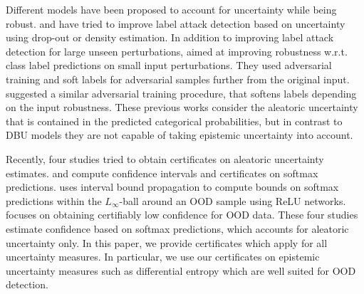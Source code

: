 Different models have been proposed to account for uncertainty while being robust.  \citep{smith2018} and \citep{simple_ood_adv_detection} have tried to improve label attack detection based on uncertainty using drop-out or density estimation. In addition to improving label attack detection for large unseen perturbations, \citep{stutz2020} aimed at improving robustness w.r.t. class label predictions on small input perturbations. They used adversarial training and soft labels for adversarial samples further from the original input. \citep{qin2020} suggested a similar adversarial training procedure, that softens labels depending on the input robustness. These previous works consider the aleatoric uncertainty that is contained in the predicted categorical probabilities, but in contrast to DBU models they are not capable of taking epistemic uncertainty into account. 



Recently, four studies tried to obtain certificates on aleatoric uncertainty estimates. \citep{single_model_quantile} and \citep{confidence_certificate_rs} compute confidence intervals and certificates on softmax predictions. \citep{bitterwolf2020} uses interval bound propagation to compute bounds on softmax predictions within the $L_{\infty}$-ball around an OOD sample using ReLU networks. \citep{meinke2020} focuses on obtaining certifiably low confidence for OOD data. These four studies estimate confidence based on softmax predictions, which accounts for aleatoric uncertainty only. In this paper, we provide certificates which apply for all uncertainty measures. In particular, we use our certificates on epistemic uncertainty measures such as differential entropy which are well suited for OOD detection.



